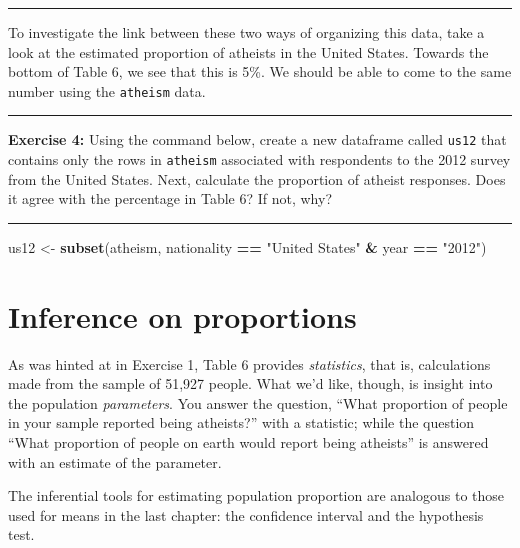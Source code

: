\documentclass[]{book}
\newenvironment{Shaded}{\begin{snugshade}}{\end{snugshade}}
\newcommand{\KeywordTok}[1]{\textcolor[rgb]{0.13,0.29,0.53}{\textbf{#1}}}
\newcommand{\NormalTok}[1]{#1}
\newcommand{\OperatorTok}[1]{\textcolor[rgb]{0.81,0.36,0.00}{\textbf{#1}}}
\newcommand{\StringTok}[1]{\textcolor[rgb]{0.31,0.60,0.02}{#1}}
\theoremstyle{definition}
\theoremstyle{definition}
\theoremstyle{definition}
\theoremstyle{remark}
\begin{document}
\begin{center}\rule{0.5\linewidth}{\linethickness}\end{center}

To investigate the link between these two ways of organizing this data,
take a look at the estimated proportion of atheists in the United
States. Towards the bottom of Table 6, we see that this is 5\%. We
should be able to come to the same number using the \texttt{atheism}
data.

\begin{center}\rule{0.5\linewidth}{\linethickness}\end{center}

\textbf{Exercise 4:} Using the command below, create a new dataframe
called \texttt{us12} that contains only the rows in \texttt{atheism}
associated with respondents to the 2012 survey from the United States.
Next, calculate the proportion of atheist responses. Does it agree with
the percentage in Table 6? If not, why?

\begin{center}\rule{0.5\linewidth}{\linethickness}\end{center}

\begin{Shaded}
\begin{Highlighting}[]
\NormalTok{us12 <-}\StringTok{ }\KeywordTok{subset}\NormalTok{(atheism, nationality }\OperatorTok{==}\StringTok{ "United States"} \OperatorTok{&}\StringTok{ }\NormalTok{year }\OperatorTok{==}\StringTok{ "2012"}\NormalTok{)}
\end{Highlighting}
\end{Shaded}

\hypertarget{inference-on-proportions}{%
\section{Inference on proportions}\label{inference-on-proportions}}

As was hinted at in Exercise 1, Table 6 provides \emph{statistics}, that
is, calculations made from the sample of 51,927 people. What we'd like,
though, is insight into the population \emph{parameters}. You answer the
question, ``What proportion of people in your sample reported being
atheists?'' with a statistic; while the question ``What proportion of
people on earth would report being atheists'' is answered with an
estimate of the parameter.

The inferential tools for estimating population proportion are analogous
to those used for means in the last chapter: the confidence interval and
the hypothesis test.
\end{document}
